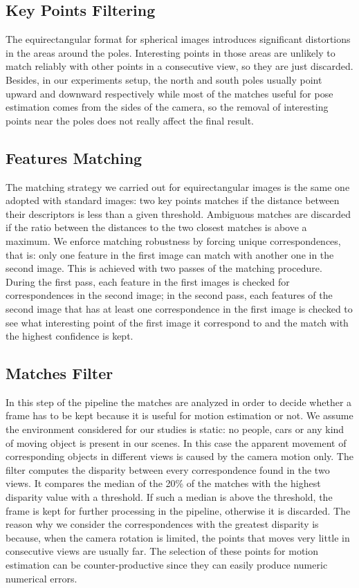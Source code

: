 \subsection{Key Points Filtering}
The equirectangular format for spherical images introduces significant 
distortions in the areas around the poles. Interesting points in those areas 
are unlikely to match reliably with other points in a consecutive view, 
so they are just discarded.
Besides, in our experiments setup, the north and south poles usually point 
upward and downward respectively while most of the matches useful for pose 
estimation comes from the sides of the camera, so the removal of interesting 
points near the poles does not really affect the final result.

\subsection{Features Matching}
The matching strategy we carried out for equirectangular images is the same one 
adopted with standard images: two key points matches if the distance between 
their descriptors is less than a given threshold. Ambiguous matches 
are discarded if the ratio between the distances to the two closest matches is 
above a maximum.
We enforce matching robustness by forcing unique correspondences, that is:
only one feature in the first image can match with another one in the second
image. This is achieved with two passes of the matching procedure. During the 
first pass, each feature in the first images is checked for correspondences in
the second image; in the second pass, each features of the second image that 
has at least one correspondence in the first image is checked to see what 
interesting point of the first image it correspond to and the match with the
highest confidence is kept.

\subsection{Matches Filter}
In this step of the pipeline the matches are analyzed in order to decide 
whether a frame has to be kept because it is useful for motion estimation or
not.
We assume the environment considered for our studies is static: no people, 
cars or any kind of moving object is present in our scenes. In this case the 
apparent movement of corresponding objects in different views is caused by 
the camera motion only.
The filter computes the disparity between every correspondence found in the 
two views. It compares the median of the 20\% of the matches with the highest 
disparity value with a threshold. If such a median is above 
the threshold, the frame is kept for further processing in the pipeline, 
otherwise it is discarded.
The reason why we consider the correspondences with the greatest disparity is 
because, when the camera rotation is limited, the points that moves very little 
in consecutive views are usually far. The selection of these points for motion 
estimation can be counter-productive since they can easily produce numeric 
numerical errors. 

